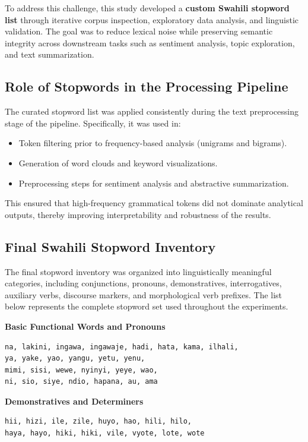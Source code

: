 To address this challenge, this study developed a \textbf{custom Swahili stopword list} through iterative corpus inspection, exploratory data analysis, and linguistic validation. The goal was to reduce lexical noise while preserving semantic integrity across downstream tasks such as sentiment analysis, topic exploration, and text summarization.

\subsection*{Role of Stopwords in the Processing Pipeline}

The curated stopword list was applied consistently during the text preprocessing stage of the pipeline. Specifically, it was used in:
\begin{itemize}
    \item Token filtering prior to frequency-based analysis (unigrams and bigrams).
    \item Generation of word clouds and keyword visualizations.
    \item Preprocessing steps for sentiment analysis and abstractive summarization.
\end{itemize}

This ensured that high-frequency grammatical tokens did not dominate analytical outputs, thereby improving interpretability and robustness of the results.

\subsection*{Final Swahili Stopword Inventory}

The final stopword inventory was organized into linguistically meaningful categories, including conjunctions, pronouns, demonstratives, interrogatives, auxiliary verbs, discourse markers, and morphological verb prefixes. The list below represents the complete stopword set used throughout the experiments.

\textbf{Basic Functional Words and Pronouns}
\begin{verbatim}
na, lakini, ingawa, ingawaje, hadi, hata, kama, ilhali,
ya, yake, yao, yangu, yetu, yenu,
mimi, sisi, wewe, nyinyi, yeye, wao,
ni, sio, siye, ndio, hapana, au, ama
\end{verbatim}

\textbf{Demonstratives and Determiners}
\begin{verbatim}
hii, hizi, ile, zile, huyo, hao, hili, hilo,
haya, hayo, hiki, hiki, vile, vyote, lote, wote
\end{verbatim}

